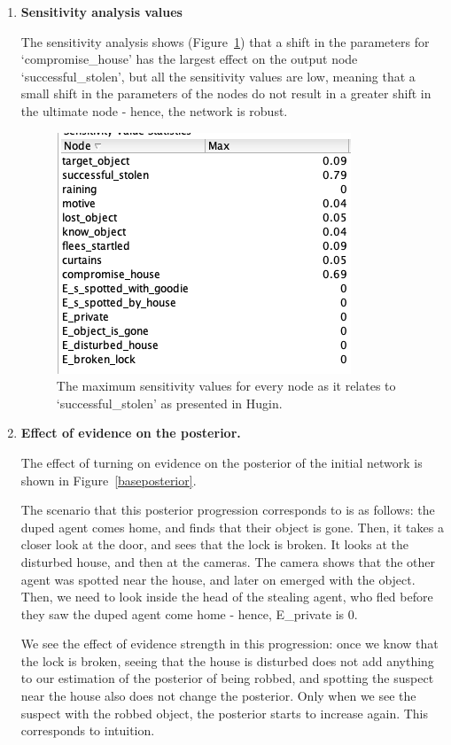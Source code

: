 \begin{enumerate}
\begin{table}
\end{table}


\item \textbf{Sensitivity analysis values}

The sensitivity analysis shows (Figure~\ref{sensitivitySL}) that a shift in the parameters for `compromise\_house' has the largest effect on the output node `successful\_stolen', but all the sensitivity values are low, meaning that a small shift in the parameters of the nodes do not result in a greater shift in the ultimate node - hence, the network is robust.

\begin{figure}[htbp]
 \centering
\includegraphics[width=0.6\linewidth]{images/sensitivitySL.png}
\caption{The maximum sensitivity values for every node as it relates to `successful\_stolen' as presented in Hugin.}
\label{sensitivitySL}
\end{figure}%


\item \textbf{Effect of evidence on the posterior.}

The effect of turning on evidence on the posterior of the initial network is shown in Figure~\ref{baseposterior}.

The scenario that this posterior progression corresponds to is as follows: the duped agent comes home, and finds that their object is gone. Then, it takes a closer look at the door, and sees that the lock is broken. It looks at the disturbed house, and then at the cameras. The camera shows that the other agent was spotted near the house, and later on emerged with the object. Then, we need to look inside the head of the stealing agent, who fled before they saw the duped agent come home - hence, E\_private is 0.

We see the effect of evidence strength in this progression: once we know that the lock is broken, seeing that the house is disturbed does not add anything to our estimation of the posterior of being robbed, and spotting the suspect near the house also does not change the posterior. Only when we see the suspect with the robbed object, the posterior starts to increase again. This corresponds to intuition.


\end{enumerate}
